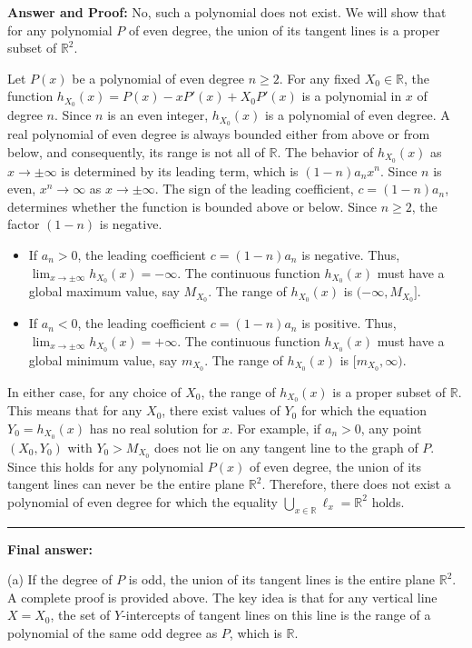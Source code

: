 \documentclass[12pt,a4paper]{article}
\theoremstyle{definition}
\begin{document}
\textbf{Answer and Proof:}
No, such a polynomial does not exist. We will show that for any polynomial $P$ of even degree, the union of its tangent lines is a proper subset of $\mathbb{R}^2$.

Let $P(x)$ be a polynomial of even degree $n \geq 2$.
For any fixed $X_0 \in \mathbb{R}$, the function $h_{X_0}(x) = P(x) - xP'(x) + X_0 P'(x)$ is a polynomial in $x$ of degree $n$. Since $n$ is an even integer, $h_{X_0}(x)$ is a polynomial of even degree.
A real polynomial of even degree is always bounded either from above or from below, and consequently, its range is not all of $\mathbb{R}$.
The behavior of $h_{X_0}(x)$ as $x \to \pm\infty$ is determined by its leading term, which is $(1-n)a_n x^n$.
Since $n$ is even, $x^n \to \infty$ as $x \to \pm\infty$. The sign of the leading coefficient, $c = (1-n)a_n$, determines whether the function is bounded above or below. Since $n \geq 2$, the factor $(1-n)$ is negative.
\begin{itemize}
\item If $a_n > 0$, the leading coefficient $c = (1-n)a_n$ is negative. Thus, $\lim_{x \to \pm\infty} h_{X_0}(x) = -\infty$. The continuous function $h_{X_0}(x)$ must have a global maximum value, say $M_{X_0}$. The range of $h_{X_0}(x)$ is $(-\infty, M_{X_0}]$.
\item If $a_n < 0$, the leading coefficient $c = (1-n)a_n$ is positive. Thus, $\lim_{x \to \pm\infty} h_{X_0}(x) = +\infty$. The continuous function $h_{X_0}(x)$ must have a global minimum value, say $m_{X_0}$. The range of $h_{X_0}(x)$ is $[m_{X_0}, \infty)$.
\end{itemize}

In either case, for any choice of $X_0$, the range of $h_{X_0}(x)$ is a proper subset of $\mathbb{R}$. This means that for any $X_0$, there exist values of $Y_0$ for which the equation $Y_0 = h_{X_0}(x)$ has no real solution for $x$.
For example, if $a_n > 0$, any point $(X_0, Y_0)$ with $Y_0 > M_{X_0}$ does not lie on any tangent line to the graph of $P$.
Since this holds for any polynomial $P(x)$ of even degree, the union of its tangent lines can never be the entire plane $\mathbb{R}^2$.
Therefore, there does not exist a polynomial of even degree for which the equality $\bigcup_{x \in \mathbb{R}} \ell_x = \mathbb{R}^2$ holds.

\rule{\textwidth}{0.5pt}

\textbf{Final answer:}

(a) If the degree of $P$ is odd, the union of its tangent lines is the entire plane $\mathbb{R}^2$. A complete proof is provided above. The key idea is that for any vertical line $X=X_0$, the set of $Y$-intercepts of tangent lines on this line is the range of a polynomial of the same odd degree as $P$, which is $\mathbb{R}$.
\end{document}

